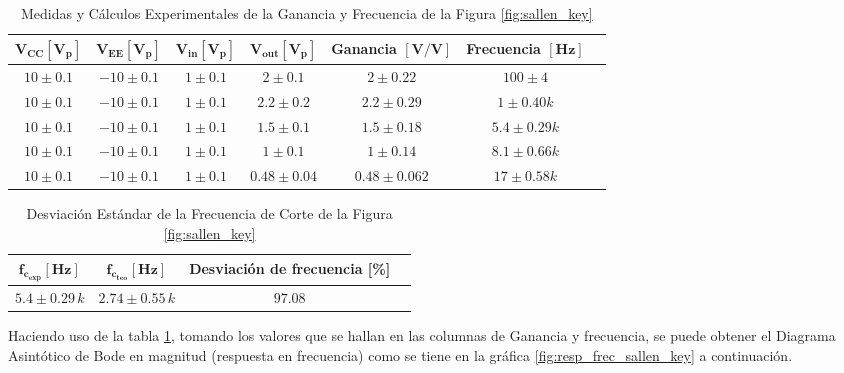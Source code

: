            \begin{table}[H]
              \centering
              \begin{tabular}{|c|c|c|c|c|c|c|}
                \hline
                $\mathbf{V_{CC} [V_p]}$ & $\mathbf{V_{EE} [V_p]}$ & $\mathbf{V_{in} [V_p]}$ & $\mathbf{V_{out} [V_p]}$ & \textbf{Ganancia} $\mathbf{[V/V]}$ & \textbf{Frecuencia} $\mathbf{[Hz]}$ \\
                \hline
                $10 \pm 0.1$ & $-10 \pm 0.1$ & $1 \pm 0.1$ & $2 \pm 0.1$ & $2 \pm 0.22$ & $100 \pm 4 $ \\
                \hline
                $10 \pm 0.1$ & $-10 \pm 0.1$ & $1 \pm 0.1$ & $2.2 \pm 0.2$ & $2.2 \pm 0.29$ & $1 \pm 0.40 k$ \\
                \hline
                $10 \pm 0.1$ & $-10 \pm 0.1$ & $1 \pm 0.1$ & $1.5 \pm 0.1 $ & $1.5 \pm 0.18$ & $5.4 \pm 0.29 k$ \\
                \hline
                $10 \pm 0.1$ & $-10 \pm 0.1$ & $1 \pm 0.1$ & $1 \pm 0.1$ & $1 \pm 0.14$ & $8.1 \pm 0.66 k$ \\
                \hline
                $10 \pm 0.1$ & $-10 \pm 0.1$ & $1 \pm 0.1$ & $ 0.48\pm 0.04$ & $0.48 \pm 0.062$ & $17 \pm 0.58 k$ \\
                \hline
              \end{tabular}
              \caption{Medidas y Cálculos Experimentales de la Ganancia y Frecuencia de la Figura \ref{fig:sallen_key}}
              \label{tab:exp_sallen_key}
            \end{table}

            \begin{table}[H]
              \centering
              \begin{tabular}{|c|c|c|c|}
                \hline
                $\mathbf{f_{c_{exp}} [Hz]}$ & $\mathbf{f_{c_{teo}} [Hz]}$ & \textbf{Desviación de frecuencia [\%]} \\
                \hline
                $5.4 \pm 0.29 \, k$ & $2.74 \pm 0.55 \, k$ & $97.08$ \\
                \hline
              \end{tabular}
              \caption{Desviación Estándar de la Frecuencia de Corte de la Figura \ref{fig:sallen_key}}
              \label{tab:exp_sallen_key_frecorte}
            \end{table}
    
            Haciendo uso de la tabla \ref{tab:exp_sallen_key}, tomando los valores que se hallan en las columnas de Ganancia y frecuencia, se puede obtener el Diagrama  Asintótico de Bode en magnitud (respuesta en frecuencia) como se tiene en la gráfica \ref{fig:resp_frec_sallen_key} a continuación.

